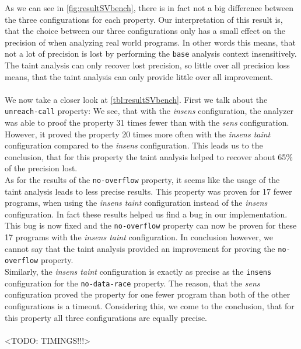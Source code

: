      As we can see in \autoref{fig:resultSVbench}, there is in fact not a big difference between the three configurations for each property. Our interpretation of this result is, that the choice between our three configurations only has a small effect on the precision of \gob when analyzing real world programs. In other words this means, that not a lot of precision is lost by performing the \texttt{base} analysis context insensitively. The taint analysis can only recover lost precision, so little over all precision loss means, that the taint analysis can only provide little over all improvement.\\
      \\
      We now take a closer look at \autoref{tbl:resultSVbench}. First we talk about the \texttt{unreach-call} property: We see, that with the \textit{insens} configuration, the analyzer was able to proof the property 31 times fewer than with the \textit{sens} configuration. However, it proved the property 20 times more often with the \textit{insens taint} configuration compared to the \textit{insens} configuration. This leads us to the conclusion, that for this property the taint analysis helped to recover about 65\% of the precision lost.\\
      As for the results of the \texttt{no-overflow} property, it seems like the usage of the taint analysis leads to less precise results. This property was proven for 17 fewer programs, when using the \textit{insens taint} configuration instead of the \textit{insens} configuration. In fact these results helped us find a bug in our implementation. This bug is now fixed and the \texttt{no-overflow} property can now be proven for these 17 programs with the \textit{insens taint} configuration. In conclusion however, we cannot say that the taint analysis provided an improvement for proving the \texttt{no-overflow} property.\\
      Similarly, the \textit{insens taint} configuration is exactly as precise as the \texttt{insens} configuration for the \texttt{no-data-race} property. The reason, that the \textit{sens} configuration proved the property for one fewer program than both of the other configurations is a timeout. Considering this, we come to the conclusion, that for this property all three configurations are equally precise.\\
      \\
      <TODO: TIMINGS!!!>\\
